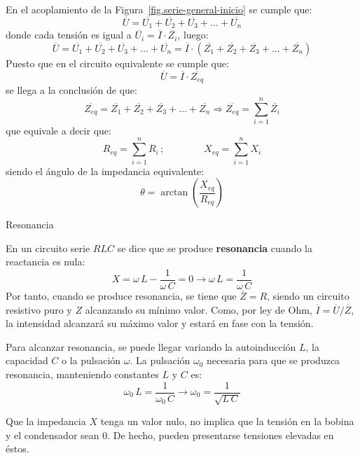 \documentclass[11pt]{book} %
\makeatletter
\numberwithin{dummy}{section}
\theoremstyle{ocrenumbox}
\theoremstyle{blacknumex}
\theoremstyle{blacknumbox}
\theoremstyle{ocrenum}
\newenvironment{remark}{\par\vspace{10pt}\small %
\begin{list}{}{
\leftmargin=35pt %
\rightmargin=25pt}\item\ignorespaces %
\makebox[-2.5pt]{\begin{tikzpicture}[overlay]
\node[draw=ocre!60,line width=1pt,circle,fill=ocre!25,font=\sffamily\bfseries,inner sep=2pt,outer sep=0pt] at (-15pt,0pt){\textcolor{ocre}{N}};\end{tikzpicture}} %
\advance\baselineskip -1pt}{\end{list}\vskip5pt} %
\renewcommand{\subsection}{\@startsection {subsection}{2}{\z@}
{-3ex \@plus -0.1ex \@minus -.4ex}
{0.5ex \@plus.2ex }
{\normalfont\sffamily\bfseries}}
\newlength\esp
\makeatother
\begin{document}
	En el acoplamiento de la Figura~\ref{fig.serie-general-inicio} se cumple que:
	\begin{equation*}
		\overline{U}=\overline{U_1}+\overline{U_2}+\overline{U_3}+...+\overline{U_n}
	\end{equation*}
	donde cada tensión es igual a $\overline{U_i}=\overline{I}\cdot\overline{Z_i}$, luego: 
	\begin{equation*}
		\overline{U}=\overline{U_1}+\overline{U_2}+\overline{U_3}+...+\overline{U_n}=\overline{I} \cdot(\overline{Z_1}+\overline{Z_2}+\overline{Z_3}+...+\overline{Z_n})
	\end{equation*}
	Puesto que en el circuito equivalente se cumple que: 
	\begin{equation*}
		\overline{U}=\overline{I}\cdot\overline{Z_{eq}}
	\end{equation*}
	se llega a la conclusión de que:
	\begin{equation}
		\overline{Z_{eq}}=\overline{Z_1}+\overline{Z_2}+\overline{Z_3}+...+\overline{Z_n}\Rightarrow \boxed{\overline{Z_{eq}}=\sum_{i=1}^n \overline{Z_i}}
	\end{equation}
	que equivale a decir que: 
	\begin{equation*}
		R_{eq}=\sum_{i=1}^n R_i\,;\qquad \qquad X_{eq}=\sum_{i=1}^n X_i
	\end{equation*}
	siendo el ángulo de la impedancia equivalente:
	\begin{equation*}
		\theta=\arctan\left(\dfrac{X_{eq}}{R_{eq}}\right)
	\end{equation*}
	
	\subsection{Resonancia}\label{sec.resonancia_serie}
	
	En un circuito serie $RLC$ se dice que se produce \textbf{resonancia} cuando la reactancia es nula:
	\begin{equation*}
		X=\omega\,L-\dfrac{1}{\omega\,C}=0\rightarrow \omega\,L=\dfrac{1}{\omega\,C}
	\end{equation*}
	Por tanto, cuando se produce resonancia, se tiene que $\overline{Z}=R$, siendo un circuito resistivo puro y $Z$ alcanzando su mínimo valor. Como, por ley de Ohm, $\overline{I}=\overline{U}/\overline{Z}$, la intensidad alcanzará su máximo valor y estará en fase con la tensión. 
	
	Para alcanzar resonancia, se puede llegar variando la autoinducción $L$, la capacidad $C$ o la pulsación $\omega$. La pulsación $\omega_0$ necesaria para que se produzca resonancia, manteniendo constantes $L$ y $C$ es:
	\begin{equation}
		\omega_0\,L=\dfrac{1}{\omega_0\,C}\rightarrow \boxed{\omega_0=\dfrac{1}{\sqrt{L\,C}}}
	\end{equation}
	\begin{remark}
		Que la impedancia $X$ tenga un valor nulo, no implica que la tensión en la bobina y el condensador sean 0. De hecho, pueden presentarse tensiones elevadas en éstos.
	\end{remark}
	
\end{document}
